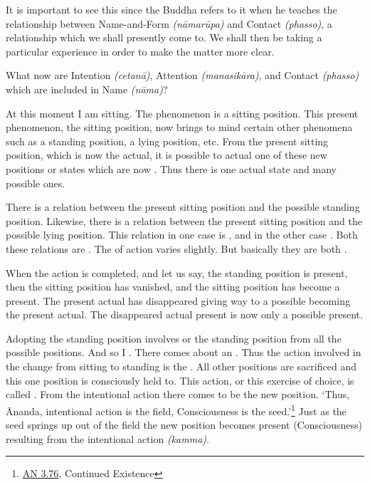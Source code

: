 It is important to see this since the Buddha refers to it when he teaches the relationship between Name-and-Form \emph{(nāmarūpa)} and Contact \emph{(phasso)}, a relationship which we shall presently come to. We shall then be taking a particular experience in order to make the matter more clear.

What now are Intention \emph{(cetanā)}, Attention \emph{(manasikāra)}, and Contact \emph{(phasso)} which are included in Name \emph{(nāma)}?

At this moment I am sitting. The  phenomenon is a sitting position. This present phenomenon, the sitting position, now brings to mind certain other phenomena such as a standing position, a lying position, etc. From the present sitting position, which is now the actual, it is possible to  actual one of these new positions or states which are now . Thus there is one actual state and many possible ones.

There is a relation between the present sitting position and the possible standing position. Likewise, there is a relation between the present sitting position and the possible lying position. This relation in one case is , and in the other case . Both these relations are . The  of action varies slightly. But basically they are both .

When the action is completed, and let us say, the standing position is present, then the sitting position has vanished, and the sitting position has become a  present. The present actual has disappeared giving way to a possible becoming the present actual. The disappeared actual present is now only a possible present.

Adopting the standing position involves  or  the standing position from all the possible positions. And so I . There comes about an . Thus the action involved in the change from sitting to standing is the . All other positions are sacrificed and this one position is consciously held to. This action, or this exercise of choice, is called . From the intentional action there comes to be  the new position. `Thus, Ānanda, intentional action is the field, Consciousness is the seed.'\footnote{\href{https://suttacentral.net/an3.76/en/thanissaro}{AN 3.76}, Continued Existence} Just as the seed springs up out of the field the new position becomes present (Consciousness) resulting from the intentional action \emph{(kamma)}.


